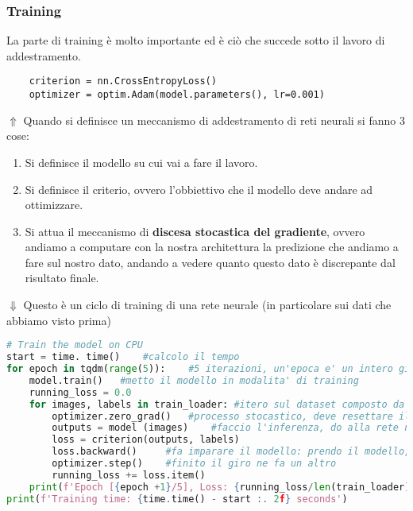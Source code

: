 \documentclass[a4paper,12pt]{article}
\begin{document}
\subsubsection{Training}
La parte di training è molto importante ed è ciò che succede sotto il lavoro di addestramento.
\begin{lstlisting}
    criterion = nn.CrossEntropyLoss()
    optimizer = optim.Adam(model.parameters(), lr=0.001)
\end{lstlisting}
$\Uparrow$ Quando si definisce un meccanismo di addestramento di reti neurali si fanno 3 cose:
\begin{enumerate}
    \item Si definisce il modello su cui vai a fare il lavoro.
    \item Si definisce il criterio, ovvero l'obbiettivo che il modello deve andare ad ottimizzare.
    \item Si attua il meccanismo di \textbf{discesa stocastica del gradiente}, ovvero andiamo a computare con la nostra architettura la predizione che andiamo a fare sul nostro dato, andando a vedere quanto questo dato è discrepante dal risultato finale.
\end{enumerate}
$\Downarrow$ Questo è un ciclo di training di una rete neurale (in particolare sui dati che abbiamo visto prima)
\begin{lstlisting}[language=Python, basicstyle=\ttfamily\footnotesize, breaklines=true, frame=single]
# Train the model on CPU
start = time. time()    #calcolo il tempo
for epoch in tqdm(range(5)):    #5 iterazioni, un'epoca e' un intero giro di addestramento sul dataset (1 volta)
    model.train()   #metto il modello in modalita' di training
    running_loss = 0.0
    for images, labels in train_loader: #itero sul dataset composto da immagini e categoria 
        optimizer.zero_grad()   #processo stocastico, deve resettare il gradiente 
        outputs = model (images)    #faccio l'inferenza, do alla rete neurale l'input e lui restituira un output (questo prende l'immagine e ritorna la classe)
        loss = criterion(outputs, labels)   
        loss.backward()     #fa imparare il modello: prendo il modello, gli do un immagine e lui ci da una risposta. Confronto l'immagine col mio dato di riferimento, vedo quanto e' largo l'errore, piu' sbagli meglio impara
        optimizer.step()    #finito il giro ne fa un altro
        running_loss += loss.item()
    print(f'Epoch [{epoch +1}/5], Loss: {running_loss/len(train_loader) :. 4f}')
print(f'Training time: {time.time() - start :. 2f} seconds')
\end{lstlisting}
\end{document}
